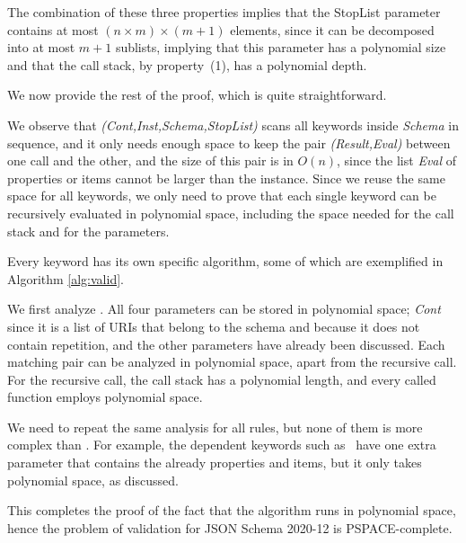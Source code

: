 \begin{appendixproof}
 The combination of these three properties implies that the StopList parameter contains at most $(n\times m) \times (m+1)$ elements,
 since it can be decomposed into at most $m+1$ sublists, implying that this parameter has a polynomial size and that the call stack, by property~(1), has a polynomial depth.
 
 We now provide the rest of the proof, which is quite straightforward.

%
%
We observe that
\emph{\SchemaValidate(Cont,Inst,Schema,StopList)} scans all keywords inside \emph{Schema} in sequence,
and it only needs enough space to keep the pair \emph{(Result,Eval)} between one call and the other,
and the size of this pair is in $O(n)$, since the list \emph{Eval} of {\evaluated} properties or items cannot be larger than the instance.
Since we reuse the same space for all keywords, we only need to prove that each single keyword can be
recursively evaluated in polynomial space, including the space needed for the call stack and for the parameters.

Every keyword has its own specific algorithm, some of which are exemplified in Algorithm \ref{alg:valid}.

We first analyze \qpattProps. All four parameters can be stored in polynomial space; \emph{Cont} since it is
a list of URIs that belong to the schema and because it does not contain repetition, and the other parameters have already been discussed.
Each matching pair can be analyzed in polynomial space, apart from the recursive call.
For the recursive call, the call stack has a polynomial length, and every called function employs polynomial space.

We need to repeat the same analysis for all rules, but none of them is more complex than \qpattProps.
For example, the dependent keywords such as \qunProps\ have one extra parameter that contains the already {\evaluated} 
properties and items, but it only takes polynomial space, as discussed.

This completes the proof of the fact that the algorithm runs in polynomial space, hence the problem of validation
for JSON Schema 2020-12 is PSPACE-complete.
\end{appendixproof}


